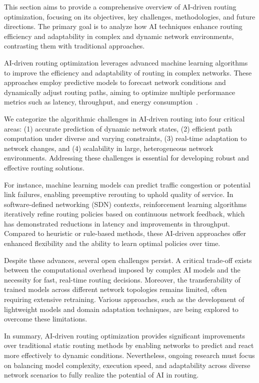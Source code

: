 \documentclass[sigconf]{acmart}
\begin{document}
This section aims to provide a comprehensive overview of AI-driven routing optimization, focusing on its objectives, key challenges, methodologies, and future directions. The primary goal is to analyze how AI techniques enhance routing efficiency and adaptability in complex and dynamic network environments, contrasting them with traditional approaches.

AI-driven routing optimization leverages advanced machine learning algorithms to improve the efficiency and adaptability of routing in complex networks. These approaches employ predictive models to forecast network conditions and dynamically adjust routing paths, aiming to optimize multiple performance metrics such as latency, throughput, and energy consumption~\cite{}. 

We categorize the algorithmic challenges in AI-driven routing into four critical areas: (1) accurate prediction of dynamic network states, (2) efficient path computation under diverse and varying constraints, (3) real-time adaptation to network changes, and (4) scalability in large, heterogeneous network environments. Addressing these challenges is essential for developing robust and effective routing solutions.

For instance, machine learning models can predict traffic congestion or potential link failures, enabling preemptive rerouting to uphold quality of service. In software-defined networking (SDN) contexts, reinforcement learning algorithms iteratively refine routing policies based on continuous network feedback, which has demonstrated reductions in latency and improvements in throughput. Compared to heuristic or rule-based methods, these AI-driven approaches offer enhanced flexibility and the ability to learn optimal policies over time.

Despite these advances, several open challenges persist. A critical trade-off exists between the computational overhead imposed by complex AI models and the necessity for fast, real-time routing decisions. Moreover, the transferability of trained models across different network topologies remains limited, often requiring extensive retraining. Various approaches, such as the development of lightweight models and domain adaptation techniques, are being explored to overcome these limitations.

In summary, AI-driven routing optimization provides significant improvements over traditional static routing methods by enabling networks to predict and react more effectively to dynamic conditions. Nevertheless, ongoing research must focus on balancing model complexity, execution speed, and adaptability across diverse network scenarios to fully realize the potential of AI in routing.
\end{document}
